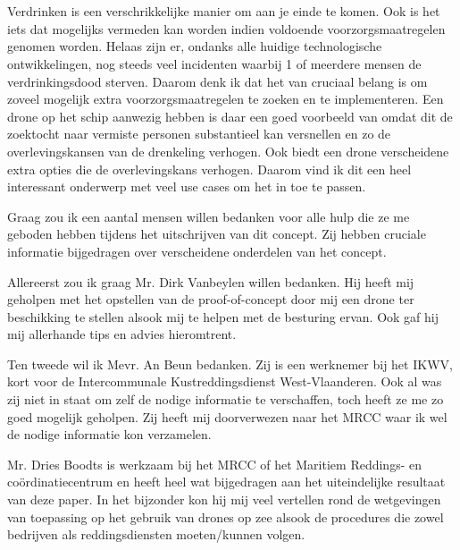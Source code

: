
\chapter*{}
\label{ch:voorwoord}

Verdrinken is een verschrikkelijke manier om aan je einde te komen. Ook is het iets dat mogelijks vermeden kan worden indien voldoende voorzorgsmaatregelen genomen worden. Helaas zijn er, ondanks alle huidige technologische ontwikkelingen, nog steeds veel incidenten waarbij 1 of meerdere mensen de verdrinkingsdood sterven. Daarom denk ik dat het van cruciaal belang is om zoveel mogelijk extra voorzorgsmaatregelen te zoeken en te implementeren. Een drone op het schip aanwezig hebben is daar een goed voorbeeld van omdat dit de zoektocht naar vermiste personen substantieel kan versnellen en zo de overlevingskansen van de drenkeling verhogen. Ook biedt een drone verscheidene extra opties die de overlevingskans verhogen. Daarom vind ik dit een heel interessant onderwerp met veel use cases om het in toe te passen. 

Graag zou ik een aantal mensen willen bedanken voor alle hulp die ze me geboden hebben tijdens het uitschrijven van dit concept. Zij hebben cruciale informatie bijgedragen over verscheidene onderdelen van het concept.

Allereerst zou ik graag Mr. Dirk Vanbeylen willen bedanken. Hij heeft mij geholpen met het opstellen van de proof-of-concept door mij een drone ter beschikking te stellen alsook mij te helpen met de besturing ervan. Ook gaf hij mij allerhande tips en advies hieromtrent.

Ten tweede wil ik Mevr. An Beun bedanken. Zij is een werknemer bij het IKWV, kort voor de Intercommunale Kustreddingsdienst West-Vlaanderen. Ook al was zij niet in staat om zelf de nodige informatie te verschaffen, toch heeft ze me zo goed mogelijk geholpen. Zij heeft mij doorverwezen naar het MRCC waar ik wel de nodige informatie kon verzamelen.

Mr. Dries Boodts is werkzaam bij het MRCC of het Maritiem Reddings- en coördinatiecentrum en heeft heel wat bijgedragen aan het uiteindelijke resultaat van deze paper. In het bijzonder kon hij mij veel vertellen rond de wetgevingen van toepassing op het gebruik van drones op zee alsook de procedures die zowel bedrijven als reddingsdiensten moeten/kunnen volgen. 

